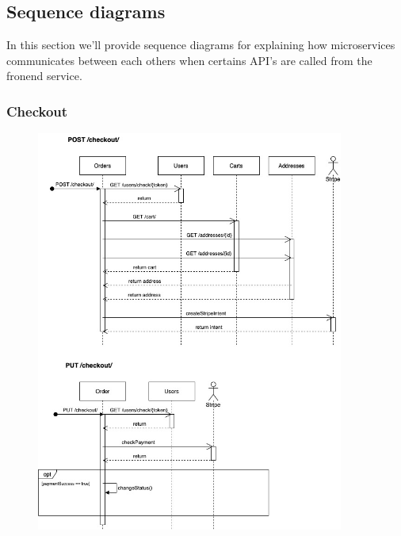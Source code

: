 \subsection{Sequence diagrams}
In this section we'll provide sequence diagrams for explaining how microservices communicates between each others
when certains API's are called from the fronend service.

\subsubsection{Checkout}
\begin{figure}[H]
    \includegraphics[width=0.9\textwidth]{res/images/sequence-diagrams/checkout.jpg}
\end{figure}

